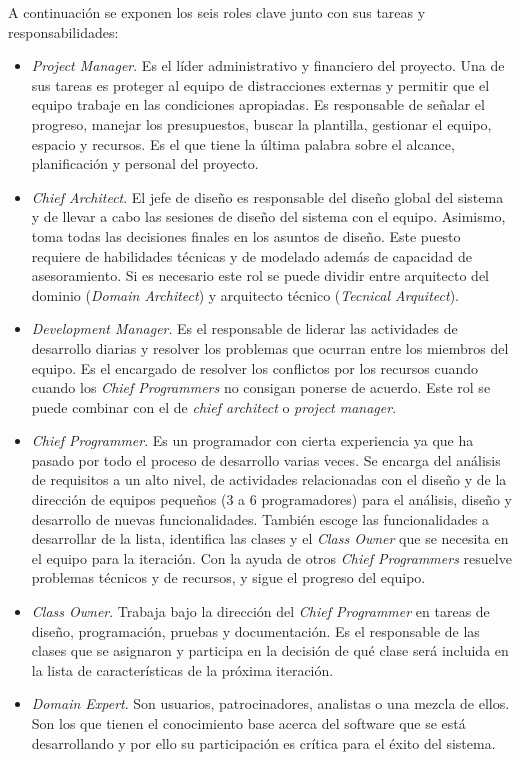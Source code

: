\documentclass[11pt]{article}
\begin{document}
A continuación se exponen los seis roles clave junto con sus tareas y responsabilidades:
\begin{itemize}
\item \textit{Project Manager}. Es el líder administrativo y financiero del proyecto. Una de sus tareas es proteger al equipo de distracciones externas y permitir que el equipo trabaje en las condiciones apropiadas. Es responsable de señalar el progreso, manejar los presupuestos, buscar la plantilla, gestionar el equipo, espacio y recursos. Es el que tiene la última palabra sobre el alcance, planificación y personal del proyecto.
\item \textit{Chief Architect}. El jefe de diseño es responsable del diseño global del sistema y de llevar a cabo las sesiones de diseño del sistema con el equipo. Asimismo, toma todas las decisiones finales en los asuntos de diseño. Este puesto requiere de habilidades técnicas y de modelado además de capacidad de asesoramiento. Si es necesario este rol se puede dividir entre arquitecto del dominio (\textit{Domain Architect}) y arquitecto técnico (\textit{Tecnical Arquitect}).
\item \textit{Development Manager}. Es el responsable de liderar las actividades de desarrollo diarias y resolver los problemas que ocurran entre los miembros del equipo. Es el encargado de resolver los conflictos por los recursos cuando cuando los \textit{Chief Programmers} no consigan ponerse de acuerdo. Este rol se puede combinar con el de \textit{chief architect} o \textit{project manager}.
\item \textit{Chief Programmer}. Es un programador con cierta experiencia ya que ha pasado por todo el proceso de desarrollo varias veces. Se encarga del análisis de requisitos a un alto nivel, de actividades relacionadas con el diseño y de la dirección de equipos pequeños (3 a 6 programadores) para el análisis, diseño y desarrollo de nuevas funcionalidades. También escoge las funcionalidades a desarrollar de la lista, identifica las clases y el \textit{Class Owner} que se necesita en el equipo para la
iteración. Con la ayuda de otros \textit{Chief Programmers} resuelve problemas técnicos y de recursos, y sigue el progreso
del equipo.
\item \textit{Class Owner}. Trabaja bajo la dirección del \textit{Chief Programmer} en tareas de diseño, programación, pruebas y documentación. Es el responsable de las clases que se asignaron y participa en la decisión de qué clase será incluida en la lista de características de la próxima iteración.
\item \textit{Domain Expert}. Son usuarios, patrocinadores, analistas o una mezcla de ellos. Son los que tienen el conocimiento base acerca del software que se está desarrollando y por ello su participación es crítica para el éxito del sistema.
\end{itemize}
\end{document}
